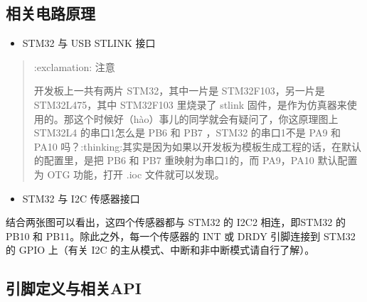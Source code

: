 \documentclass[a4paper,12pt,english]{sphinxmanual}
\begin{document}
\subsection{相关电路原理}
\label{\detokenize{exp-stm32/peripherals-and-sensors:id6}}\begin{itemize}
\item {} 
\sphinxAtStartPar
STM32 与 USB STLINK 接口

\end{itemize}

\sphinxAtStartPar
{}

\sphinxAtStartPar
{}
\begin{quote}

\sphinxAtStartPar
:exclamation: 注意

\sphinxAtStartPar
开发板上一共有两片 STM32，其中一片是 STM32F103，另一片是 STM32L475，其中 STM32F103 里烧录了 stlink 固件，是作为仿真器来使用的。那这个时候好（hào）事儿的同学就会有疑问了，你这原理图上 STM32L4 的串口1怎么是 PB6 和 PB7 ，STM32 的串口1不是 PA9 和 PA10 吗？:thinking:其实是因为如果以开发板为模板生成工程的话，在默认的配置里，是把 PB6 和 PB7 重映射为串口1的，而 PA9，PA10 默认配置为 OTG 功能，打开 .ioc 文件就可以发现。

\sphinxAtStartPar
{}
\end{quote}
\begin{itemize}
\item {} 
\sphinxAtStartPar
STM32 与 I2C 传感器接口

\end{itemize}

\sphinxAtStartPar
{}

\sphinxAtStartPar
{}

\sphinxAtStartPar
结合两张图可以看出，这四个传感器都与 STM32 的 I2C2 相连，即STM32 的 PB10 和 PB11。除此之外，每一个传感器的 INT 或 DRDY 引脚连接到 STM32 的 GPIO 上（有关 I2C 的主从模式、中断和非中断模式请自行了解）。

\sphinxAtStartPar
{}


\subsection{引脚定义与相关API}
\label{\detokenize{exp-stm32/peripherals-and-sensors:api}}
\end{document}
